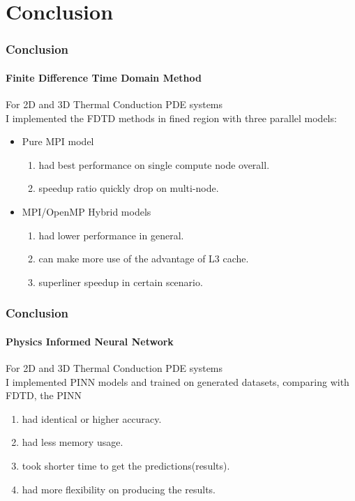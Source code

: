 \section{Conclusion}



\begin{frame}
  \frametitle{Conclusion}
  \framesubtitle{Finite Difference Time Domain Method}
  For 2D and 3D Thermal Conduction PDE systems \\
  I implemented the FDTD methods in fined region with three parallel models:
  \begin{itemize}
    \item Pure MPI model 
    \begin{enumerate}
      \item had best performance on single compute node overall.
      \item speedup ratio quickly drop on multi-node.
    \end{enumerate}
    \item MPI/OpenMP Hybrid models 
    \begin{enumerate}
      \item had lower performance in general.
      \item can make more use of the advantage of L3 cache.
      \item superliner speedup in certain scenario.
    \end{enumerate}
  \end{itemize}

\end{frame}


\begin{frame}
  \frametitle{Conclusion}
  \framesubtitle{Physics Informed Neural Network}
  For 2D and 3D Thermal Conduction PDE systems \\
  I implemented PINN models and trained on generated datasets, comparing with FDTD, the PINN 
  \begin{enumerate}
    \item had identical or higher accuracy.
    \item had less memory usage.
    \item took shorter time to get the predictions(results).
    \item had more flexibility on producing the results.
  \end{enumerate}

\end{frame}

